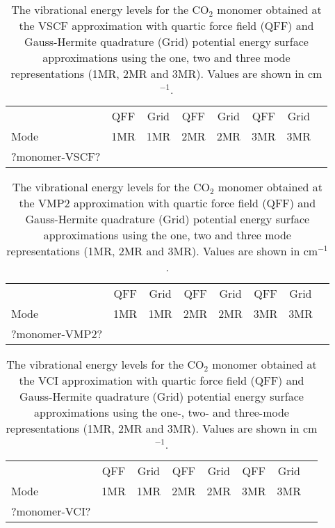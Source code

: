 \documentclass[aip,jcp,showpacs,superscriptaddress,groupedaddress]{revtex4-1}  %
\begin{document}
\begin{table}[h]
\caption{The vibrational energy levels for the CO$_2$ monomer obtained at the VSCF approximation with quartic force field (QFF) and Gauss-Hermite quadrature (Grid) potential energy surface approximations using the one, two and three mode representations (1MR, 2MR and 3MR). Values are shown in cm$^{-1}$.}
\begin{ruledtabular}
\begin{tabular}{lccccccc}
    & QFF &  Grid & QFF & Grid & QFF & Grid   \\  
  Mode & 1MR & 1MR & 2MR & 2MR & 3MR & 3MR   \\ 
\hline \Tstrut
?monomer-VSCF?
\end{tabular}
\end{ruledtabular}
\label{table:monomer-vscf}
\end{table}  

\begin{table}[h]
\caption{The vibrational energy levels for the CO$_2$ monomer obtained at the VMP2 approximation with quartic force field (QFF) and Gauss-Hermite quadrature (Grid) potential energy surface approximations using the one, two and three mode representations (1MR, 2MR and 3MR). Values are shown in cm$^{-1}$.}
\begin{ruledtabular}
\begin{tabular}{lccccccc}
    & QFF &  Grid & QFF & Grid & QFF & Grid   \\  
  Mode & 1MR & 1MR & 2MR & 2MR & 3MR & 3MR   \\ 
\hline \Tstrut
?monomer-VMP2?
\end{tabular}
\end{ruledtabular}
\label{table:monomer-vmp2}
\end{table}

\begin{table}[h]
    \caption{The vibrational energy levels for the CO$_2$ monomer obtained at the VCI approximation with quartic force field (QFF) and Gauss-Hermite quadrature (Grid) potential energy surface approximations using the one-, two- and three-mode representations (1MR, 2MR and 3MR). Values are shown in cm$^{-1}$.}
\begin{ruledtabular}
\begin{tabular}{lccccccc}
    & QFF &  Grid & QFF & Grid & QFF & Grid   \\  
  Mode & 1MR & 1MR & 2MR & 2MR & 3MR & 3MR   \\ 
\hline \Tstrut
?monomer-VCI?
\end{tabular}
\end{ruledtabular}
\label{table:monomer-vci}
\end{table}
\end{document}
